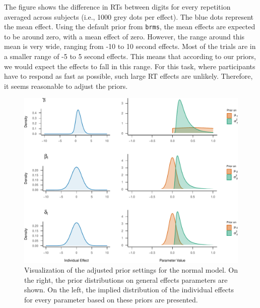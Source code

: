 \documentclass[
  english,
  doc,floatsintext]{apa6}
\begin{document}
The figure shows the difference in RTs between digits for every repetition averaged across subjects (i.e., 1000 grey dots per effect). The blue dots represent the mean effect. Using the default prior from \texttt{brms}, the mean effects are expected to be around zero, with a mean effect of zero. However, the range around this mean is very wide, ranging from -10 to 10 second effects. Most of the trials are in a smaller range of -5 to 5 second effects. This means that according to our priors, we would expect the effects to fall in this range. For this task, where participants have to respond as fast as possible, such large RT effects are unlikely. Therefore, it seems reasonable to adjust the priors.

\begin{figure}[H]

\includegraphics{manuscript_files/figure-latex/priorvisualization2-1} \hfill{}

\caption{Visualization of the adjusted prior settings for the normal model. On the right, the prior distributions on general effects parameters are shown. On the left, the implied distribution of the individual effects for every parameter based on these priors are presented. }\label{fig:priorvisualization2}
\end{figure}
\end{document}
